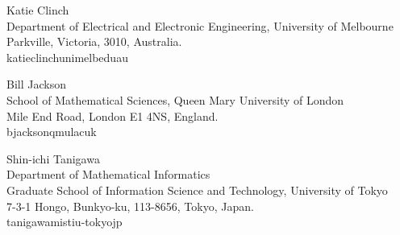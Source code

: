 \documentclass{daj}
\begin{document}
\begin{dajauthors}
\begin{authorinfo}[katie]
Katie Clinch\\Department of Electrical and Electronic Engineering, University of Melbourne\\ Parkville, Victoria, 3010, Australia.\\ 
 katie\imagedot{}clinch\imageat{}unimelb\imagedot{}edu\imagedot{}au
\end{authorinfo}
\begin{authorinfo}[bill]
Bill Jackson\\
School
of Mathematical Sciences, Queen Mary University of London\\
Mile End Road, London E1 4NS, England.\\
b\imagedot{}jackson\imageat{}qmul\imagedot{}ac\imagedot{}uk
\end{authorinfo}
\begin{authorinfo}[shin]
Shin-ichi Tanigawa\\
Department of Mathematical Informatics\\ 
Graduate School of Information Science and Technology, University of Tokyo\\ 
7-3-1 Hongo, Bunkyo-ku, 113-8656,  Tokyo, Japan. \\ 
tanigawa\imageat{}mist\imagedot{}i\imagedot{}u-tokyo\imagedot{}jp
  \end{authorinfo}
\end{dajauthors}
\end{document}
